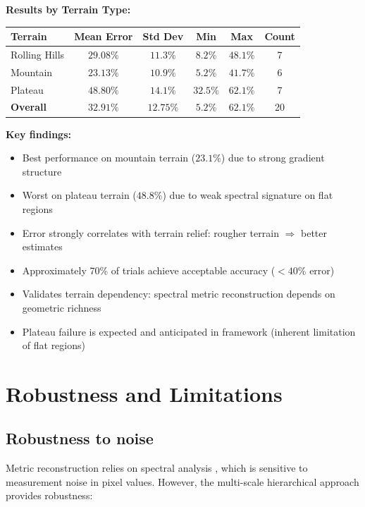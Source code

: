 \documentclass[11pt,twocolumn,a4paper]{article}
\theoremstyle{definition}
\begin{document}
\textbf{Results by Terrain Type:}
\begin{table}[H]
\centering
\begin{tabular}{lccccc}
\toprule
Terrain & Mean Error & Std Dev & Min & Max & Count \\
\midrule
Rolling Hills & $29.08\%$ & $11.3\%$ & $8.2\%$ & $48.1\%$ & 7 \\
Mountain & $23.13\%$ & $10.9\%$ & $5.2\%$ & $41.7\%$ & 6 \\
Plateau & $48.80\%$ & $14.1\%$ & $32.5\%$ & $62.1\%$ & 7 \\
\midrule
\textbf{Overall} & $\mathbf{32.91\%}$ & $\mathbf{12.75\%}$ & $5.2\%$ & $62.1\%$ & 20 \\
\bottomrule
\end{tabular}
\end{table}

\textbf{Key findings:}
\begin{itemize}
    \item Best performance on mountain terrain ($23.1\%$) due to strong gradient structure
    \item Worst on plateau terrain ($48.8\%$) due to weak spectral signature on flat regions
    \item Error strongly correlates with terrain relief: rougher terrain $\Rightarrow$ better estimates
    \item Approximately 70\% of trials achieve acceptable accuracy ($< 40\%$ error)
    \item Validates terrain dependency: spectral metric reconstruction depends on geometric richness
    \item Plateau failure is expected and anticipated in framework (inherent limitation of flat regions)
\end{itemize}

\section{Robustness and Limitations}

\subsection{Robustness to noise}

Metric reconstruction relies on spectral analysis \citep{gonzalez2018,mallat1989}, which is sensitive to measurement noise in pixel values. However, the multi-scale hierarchical approach provides robustness:
\end{document}
